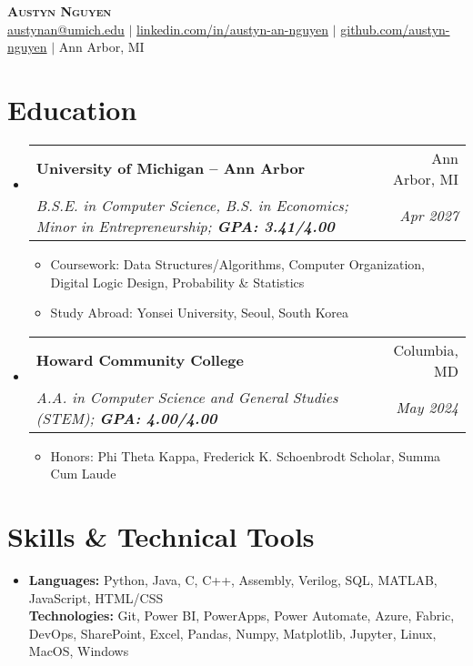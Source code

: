 \documentclass[letterpaper,11pt]{article}
\makeatletter
\newcommand{\resumeItem}[1]{\item[\textopenbullet]\small{#1 \vspace{-2pt}}}
\newcommand{\resumeSubheading}[4]{
  \vspace{-2pt}\item
  \begin{tabular*}{0.97\textwidth}[t]{l@{\extracolsep{\fill}}r}
    \textbf{#1} & #2 \\
    \textit{\small#3} & \textit{\small #4} \\
  \end{tabular*}\vspace{-7pt}
}
\newcommand{\resumeSubHeadingListStart}{\begin{itemize}[leftmargin=0.15in, label={}]}
\newcommand{\resumeSubHeadingListEnd}{\end{itemize}}
\newcommand{\resumeItemListStart}{\begin{itemize}[leftmargin=0.2in, label=\textopenbullet]}
\newcommand{\resumeItemListEnd}{\end{itemize}\vspace{-5pt}}
\makeatother
\begin{document}
\begin{center}
  \textbf{\Huge \scshape Austyn Nguyen} \\ \vspace{3pt}
  \small
  \faEnvelope \hspace{.5pt} \href{mailto:austynan@umich.edu}{austynan@umich.edu}
  $|$
  \faLinkedinSquare \hspace{.5pt} \href{https://www.linkedin.com/in/austyn-an-nguyen}{linkedin.com/in/austyn-an-nguyen}
  $|$
  \faGithub \hspace{.5pt} \href{https://github.com/austyn-nguyen}{github.com/austyn-nguyen}
  $|$
  \faMapMarker \hspace{.5pt} Ann Arbor, MI
\end{center}

\section{Education}
\resumeSubHeadingListStart
  \resumeSubheading
    {University of Michigan -- Ann Arbor}{Ann Arbor, MI}
  {B.S.E. in Computer Science, B.S. in Economics; Minor in Entrepreneurship; \textbf{GPA: 3.41/4.00}}{Apr 2027}
  \resumeItemListStart
    \resumeItem{Coursework: Data Structures/Algorithms, Computer Organization, Digital Logic Design, Probability \& Statistics}
    \resumeItem{Study Abroad: Yonsei University, Seoul, South Korea}
\resumeItemListEnd

  \resumeSubheading
    {Howard Community College}{Columbia, MD}
    {A.A. in Computer Science and General Studies (STEM); \textbf{GPA: 4.00/4.00}}{May 2024}
    \resumeItemListStart
        \resumeItem{Honors: Phi Theta Kappa, Frederick K. Schoenbrodt Scholar, Summa Cum Laude}
    \resumeItemListEnd
\resumeSubHeadingListEnd

\section{Skills \& Technical Tools}
\resumeSubHeadingListStart
  \item{
    \textbf{Languages:} Python, Java, C, C++, Assembly, Verilog, SQL, MATLAB, JavaScript, HTML/CSS \\
    \textbf{Technologies:} Git, Power BI, PowerApps, Power Automate, Azure, Fabric, DevOps, SharePoint, Excel, Pandas, Numpy, Matplotlib, Jupyter, Linux, MacOS, Windows
  }
\resumeSubHeadingListEnd
\end{document}
